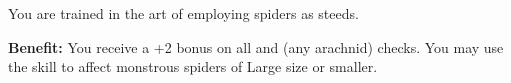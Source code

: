 
You are trained in the art of employing spiders as steeds.

\textbf{Benefit:} You receive a +2 bonus on all  and  (any arachnid) checks. You may use the  skill to affect monstrous spiders of Large size or smaller.